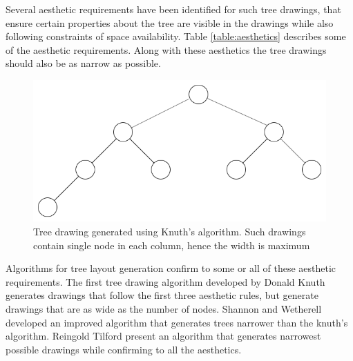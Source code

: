 \documentclass{article}
\begin{document}
Several aesthetic requirements have been identified for such tree
drawings, that ensure certain properties about the tree are visible in
the drawings while also following constraints of space availability.
Table \ref{table:aesthetics} describes some of the aesthetic
requirements.  Along with these aesthetics the tree drawings should
also be as narrow as possible.


\begin{figure}[H]
  \includegraphics[width=\textwidth]{img/knuth-2.png}
  \caption{Tree drawing generated using Knuth's algorithm.  Such
    drawings contain single node in each column, hence the width is
    maximum}
  \label{fig:knuth_tree}
\end{figure}

Algorithms for tree layout generation confirm to some or all of these
aesthetic requirements. The first tree drawing algorithm developed by
Donald Knuth \cite{Knuth1971} generates drawings that follow the first
three aesthetic rules, but generate drawings that are as wide as the
number of nodes.  Shannon and Wetherell\cite{tidydraw} developed an
improved algorithm that generates trees narrower than the knuth's
algorithm.  Reingold Tilford \cite{reingold} present an algorithm that
generates narrowest possible drawings while confirming to all the
aesthetics.
\end{document}
